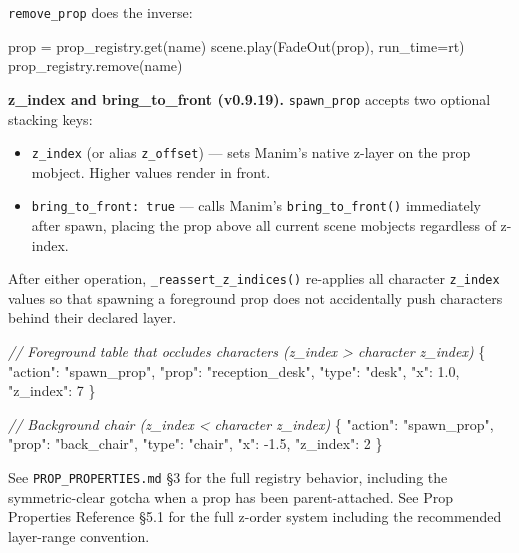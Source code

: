 \documentclass[
  12pt,
  letterpaper,
]{book}
\newenvironment{Shaded}{}{}
\newcommand{\CommentTok}[1]{\textcolor[rgb]{0.38,0.63,0.69}{\textit{#1}}}
\newcommand{\NormalTok}[1]{#1}
\newcommand{\OperatorTok}[1]{\textcolor[rgb]{0.40,0.40,0.40}{#1}}
\providecommand{\tightlist}{%
  \setlength{\itemsep}{0pt}\setlength{\parskip}{0pt}}
\begin{document}
\texttt{remove\_prop} does the inverse:

\begin{Shaded}
\begin{Highlighting}[]
\NormalTok{prop }\OperatorTok{=}\NormalTok{ prop\_registry.get(name)}
\NormalTok{scene.play(FadeOut(prop), run\_time}\OperatorTok{=}\NormalTok{rt)}
\NormalTok{prop\_registry.remove(name)}
\end{Highlighting}
\end{Shaded}

\textbf{z\_index and bring\_to\_front (v0.9.19).}
\texttt{spawn\_prop} accepts two optional stacking keys:

\begin{itemize}
\tightlist
\item
  \texttt{z\_index} (or alias \texttt{z\_offset}) --- sets Manim's
  native z-layer on the prop mobject. Higher values render in front.
\item
  \texttt{bring\_to\_front:\ true} --- calls Manim's
  \texttt{bring\_to\_front()} immediately after spawn, placing the prop
  above all current scene mobjects regardless of z-index.
\end{itemize}

After either operation, \texttt{\_reassert\_z\_indices()} re-applies all
character \texttt{z\_index} values so that spawning a foreground prop
does not accidentally push characters behind their declared layer.

\begin{Shaded}
\begin{Highlighting}[]
\CommentTok{// Foreground table that occludes characters (z\_index > character z\_index)}
\NormalTok{\{}
\NormalTok{  "action": "spawn\_prop",}
\NormalTok{  "prop": "reception\_desk",}
\NormalTok{  "type": "desk",}
\NormalTok{  "x": 1.0,}
\NormalTok{  "z\_index": 7}
\NormalTok{\}}

\CommentTok{// Background chair (z\_index < character z\_index)}
\NormalTok{\{}
\NormalTok{  "action": "spawn\_prop",}
\NormalTok{  "prop": "back\_chair",}
\NormalTok{  "type": "chair",}
\NormalTok{  "x": -1.5,}
\NormalTok{  "z\_index": 2}
\NormalTok{\}}
\end{Highlighting}
\end{Shaded}

See \texttt{PROP\_PROPERTIES.md} §3 for the full registry behavior,
including the symmetric-clear gotcha when a prop has been
parent-attached. See Prop Properties Reference §5.1 for the full
z-order system including the recommended layer-range convention.
\end{document}
